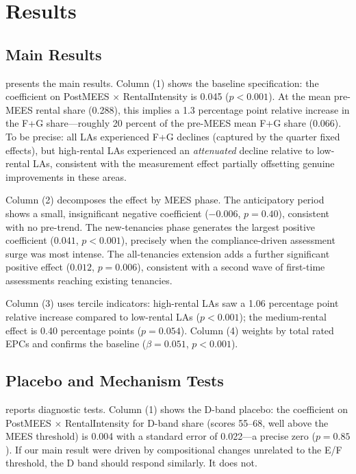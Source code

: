 \documentclass[12pt]{article}
\begin{document}
\section{Results}

\subsection{Main Results}

 presents the main results. Column (1) shows the baseline specification: the coefficient on PostMEES $\times$ RentalIntensity is 0.045 ($p < 0.001$). At the mean pre-MEES rental share (0.288), this implies a 1.3 percentage point relative increase in the F+G share---roughly 20 percent of the pre-MEES mean F+G share (0.066). To be precise: all LAs experienced F+G declines (captured by the quarter fixed effects), but high-rental LAs experienced an \textit{attenuated} decline relative to low-rental LAs, consistent with the measurement effect partially offsetting genuine improvements in these areas.

Column (2) decomposes the effect by MEES phase. The anticipatory period shows a small, insignificant negative coefficient ($-0.006$, $p = 0.40$), consistent with no pre-trend. The new-tenancies phase generates the largest positive coefficient ($0.041$, $p < 0.001$), precisely when the compliance-driven assessment surge was most intense. The all-tenancies extension adds a further significant positive effect ($0.012$, $p = 0.006$), consistent with a second wave of first-time assessments reaching existing tenancies.

Column (3) uses tercile indicators: high-rental LAs saw a 1.06 percentage point relative increase compared to low-rental LAs ($p < 0.001$); the medium-rental effect is 0.40 percentage points ($p = 0.054$). Column (4) weights by total rated EPCs and confirms the baseline ($\beta = 0.051$, $p < 0.001$).



\subsection{Placebo and Mechanism Tests}

 reports diagnostic tests. Column (1) shows the D-band placebo: the coefficient on PostMEES $\times$ RentalIntensity for D-band share (scores 55--68, well above the MEES threshold) is 0.004 with a standard error of 0.022---a precise zero ($p = 0.85$). If our main result were driven by compositional changes unrelated to the E/F threshold, the D band should respond similarly. It does not.
\end{document}
